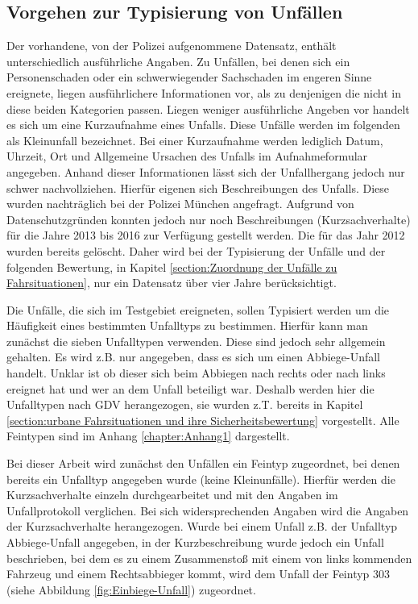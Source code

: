 \subsection{Vorgehen zur Typisierung von Unfällen}\label{subsection:Vorgehen zur Typisierung}
Der vorhandene, von der Polizei aufgenommene Datensatz, enthält unterschiedlich ausführliche Angaben. Zu Unfällen, bei denen sich ein Personenschaden oder ein schwerwiegender Sachschaden im engeren Sinne ereignete, liegen ausführlichere Informationen vor, als zu denjenigen die nicht in diese beiden Kategorien passen. Liegen weniger ausführliche Angeben vor handelt es sich um eine Kurzaufnahme eines Unfalls. Diese Unfälle werden im folgenden als Kleinunfall bezeichnet. Bei einer Kurzaufnahme werden lediglich Datum, Uhrzeit, Ort und Allgemeine Ursachen des Unfalls im Aufnahmeformular angegeben. Anhand dieser Informationen lässt sich der Unfallhergang jedoch nur schwer nachvollziehen. Hierfür eigenen sich Beschreibungen des Unfalls. Diese wurden nachträglich bei der Polizei München angefragt. Aufgrund von Datenschutzgründen konnten jedoch nur noch Beschreibungen (Kurzsachverhalte) für die Jahre 2013 bis 2016 zur Verfügung gestellt werden. Die für das Jahr 2012 wurden bereits gelöscht. Daher wird bei der Typisierung der Unfälle und der folgenden Bewertung, in Kapitel \ref{section:Zuordnung der Unfälle zu Fahrsituationen}, nur ein Datensatz über vier Jahre berücksichtigt.

Die Unfälle, die sich im Testgebiet ereigneten, sollen Typisiert werden um die Häufigkeit eines bestimmten Unfalltyps zu bestimmen. Hierfür kann man zunächst die sieben Unfalltypen verwenden. Diese sind jedoch sehr allgemein gehalten. Es wird z.B. nur angegeben, dass es sich um einen Abbiege-Unfall handelt. Unklar ist ob dieser sich beim Abbiegen nach rechts oder nach links ereignet hat und wer an dem Unfall beteiligt war. Deshalb werden hier die Unfalltypen nach GDV herangezogen, sie wurden z.T. bereits in Kapitel \ref{section:urbane Fahrsituationen und ihre Sicherheitsbewertung} vorgestellt. Alle Feintypen sind im  Anhang \ref{chapter:Anhang1} dargestellt.

Bei dieser Arbeit wird zunächst den Unfällen ein Feintyp zugeordnet, bei denen bereits ein Unfalltyp angegeben wurde (keine Kleinunfälle). Hierfür werden die Kurzsachverhalte einzeln durchgearbeitet und mit den Angaben im Unfallprotokoll verglichen. Bei sich widersprechenden Angaben wird die Angaben der Kurzsachverhalte herangezogen. Wurde bei einem Unfall z.B. der Unfalltyp Abbiege-Unfall angegeben, in der Kurzbeschreibung wurde jedoch ein Unfall beschrieben, bei dem es zu einem Zusammenstoß mit einem von links kommenden Fahrzeug und einem Rechtsabbieger kommt, wird dem Unfall der Feintyp 303 (siehe Abbildung \ref{fig:Einbiege-Unfall}) zugeordnet.

